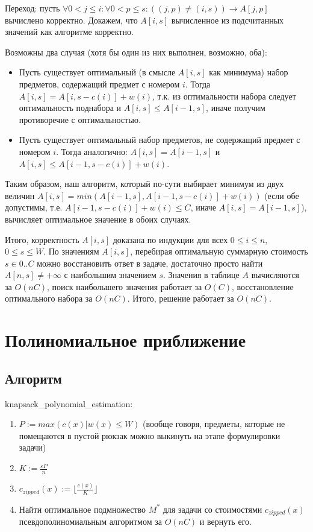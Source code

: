 \documentclass{article}
\begin{document}
	Переход: пусть $\forall 0 < j \leq i: \forall 0 < p \leq s : ((j, p) \neq (i, s)) \rightarrow A[j, p]$ вычислено корректно. Докажем, что $A[i, s]$ вычисленное из подсчитанных значений как алгоритме корректно.
	
	Возможны два случая (хотя бы один из них выполнен, возможно, оба):
	
	\begin{itemize}
		\item 
	Пусть существует оптимальный (в смысле $A[i, s]$ как минимума) набор предметов, содержащий предмет с номером $i$. Тогда $A[i, s] = A[i, s - c(i)] + w(i)$, т.к. из оптимальности набора следует оптимальность поднабора и $A[i, s] \leq A[i - 1, s]$, иначе получим противоречие с оптимальностью.
	
		\item 
	Пусть существует оптимальный набор предметов, не содержащий предмет с номером $i$. Тогда аналогично: $A[i, s] = A[i-1, s]$ и $A[i, s] \leq A[i-1, s - c(i)] + w(i)$.
	
	\end{itemize}

	Таким образом, наш алгоритм, который по-сути выбирает минимум из двух величин $A[i, s] = min(A[i - 1, s], A[i - 1, s - c(i)] + w(i))$ (если обе допустимы, т.е. $A[i - 1, s - c(i)] + w(i) \leq C$, иначе $A[i, s] = A[i-1, s]$), вычисляет оптимальное значение в обоих случаях. 
	
	Итого, корректность $A[i, s]$ доказана по индукции для всех $ 0 \leq i \leq n$, $0 \leq s \leq W$. По значениям $A[i, s]$, перебирая оптимальную суммарную стоимость $s \in 0..C$ можно восстановить ответ в задаче, достаточно просто найти $A[n, s] \neq +\infty$ с наибольшим значением $s$. Значения в таблице $A$ вычисляются за $O(nC)$, поиск наибольшего значения работает за $O(C)$, восстановление оптимального набора за $O(nC)$. Итого, решение работает за $O(nC)$.
\section{Полиномиальное приближение}
	\subsection{Алгоритм}

	knapsack\_polynomial\_estimation:
\begin{enumerate}
	\item $P := max(c(x) | w(x) \leq W)$ (вообще говоря, предметы, которые не помещаются в пустой рюкзак можно выкинуть на этапе формулировки задачи)
	\item $K := \frac{\varepsilon P}{n}$
	\item $c_{zipped}(x) := \lfloor \frac{c(x)}{K} \rfloor $
	\item Найти оптимальное подмножество $M^*$ для задачи со стоимостями $c_{zipped}(x)$ псевдополиномиальным алгоритмом за $O(nC)$ и вернуть его.
\end{enumerate}
\end{document}

